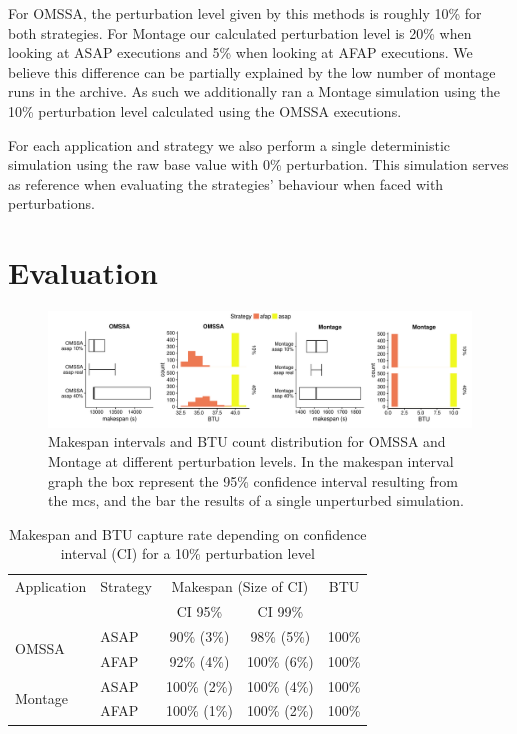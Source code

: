 \documentclass[10pt,conference,compsocconf]{IEEEtran}
\begin{document}
For OMSSA, the perturbation level given by this methods is roughly 10\% for both
strategies. For Montage  our calculated perturbation level is  20\% when looking
at ASAP  executions and  5\% when  looking at AFAP  executions. We  believe this
difference can be partially  explained by the low number of  montage runs in the
archive. As such we additionally ran a Montage simulation using the 10\% 
perturbation level calculated using the OMSSA executions.

For  each  application and  strategy  we  also  perform a  single  deterministic
simulation  using the  raw base  value  with 0\%  perturbation. This  simulation
serves as  reference when  evaluating the strategies' behaviour when  faced with
perturbations.

\section{Evaluation}
\label{sec:eval}

\begin{figure}
	\includegraphics[width=\textwidth]{gfx/int_plot.pdf}
	\caption{Makespan intervals and BTU count distribution for OMSSA and 
	Montage at different perturbation levels. In the makespan interval graph 
	the box represent the 95\% confidence interval resulting from the \acs{mcs},
	and the bar the results of a single unperturbed simulation.}\label{fig:int}
\end{figure}

\begin{table}
	\centering
	\caption{Makespan and BTU capture rate depending on confidence interval
          (CI) for a 10\% perturbation level}\label{tab:fit}
	\begin{tabular}{llccc}
		\toprule
		Application&Strategy&\multicolumn{2}{c}{Makespan (Size of CI)}&BTU\\
                           &         & CI 95\% & CI 99\% &\\
		\midrule
		\multirow{2}{*}{OMSSA}&ASAP&  90\% (3\%)&  98\% (5\%)& 100\%\\
				      &AFAP&  92\% (4\%)& 100\% (6\%)& 100\%\\
		\midrule
		\multirow{2}{*}{Montage}&ASAP& 100\% (2\%)& 100\% (4\%)& 100\%\\
					&AFAP& 100\% (1\%)& 100\% (2\%)& 100\%\\
		\bottomrule
	\end{tabular}
\end{table}
\end{document}

